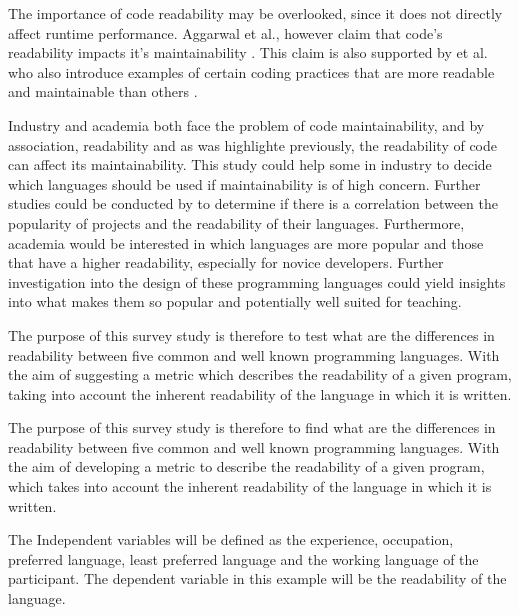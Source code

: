 \documentclass[times, 10pt,twocolumn]{IEEEtran}
\begin{document}
The importance of code readability may be overlooked, since it does not directly affect runtime performance. Aggarwal et al., however claim that code's readability impacts it's maintainability \cite{aggarwal2002integrated}. This claim is also supported by \cite{elshoff1982improving} et al. who also introduce examples of certain coding practices that are more readable and maintainable than others \cite{elshoff1982improving}.




Industry and academia both face the problem of code maintainability, and by association, readability and as was highlighte previously, the readability of code can affect its maintainability. This study could help some in industry to decide which languages should be used if maintainability is of high concern. Further studies could be conducted by to determine if there is a correlation between the popularity of projects and the readability of their languages. Furthermore, academia would be interested in which languages are more popular and those that have a higher readability, especially for novice developers. Further investigation into the design of these programming languages could yield insights into what makes them so popular and potentially well suited for teaching.
\newline

The purpose of this survey study is therefore to test what are the differences in readability between five common and well known programming languages. With the aim of suggesting a metric which describes the readability of a given program, taking into account the inherent readability of the language in which it is written.
\newline

The purpose of this survey study is therefore to find what are the differences in readability between five common and well known programming languages. With the aim of developing a metric to describe the readability of a given program, which takes into account the inherent readability of the language in which it is written.
\newline

The Independent variables will be defined as the experience, occupation, preferred language, least preferred language and the working language of the participant. The dependent variable in this example will be the readability of the language.
\newline
\end{document}
